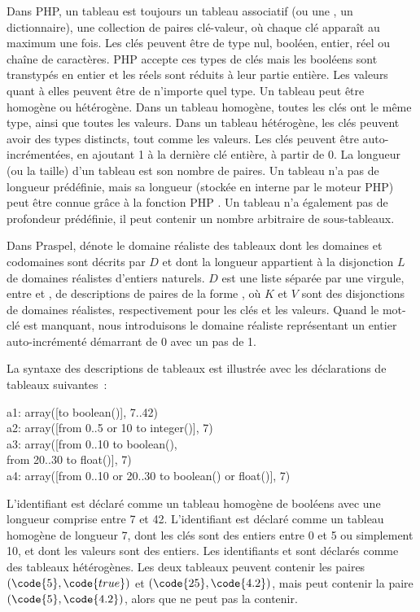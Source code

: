 Dans PHP, un tableau est toujours un {\strong tableau associatif} (ou une
, un {\strong dictionnaire}), \ie une collection de paires
clé-valeur, où chaque clé apparaît au maximum une fois. Les clés peuvent être de
type nul, booléen, entier, réel ou chaîne de caractères. PHP accepte ces types
de clés mais les booléens sont transtypés en entier et les réels sont réduits à
leur partie entière. Les valeurs quant à elles peuvent être de n'importe quel
type. Un tableau peut être {\strong homogène} ou {\strong hétérogène}. Dans un
tableau homogène, toutes les clés ont le même type, ainsi que toutes les
valeurs. Dans un tableau hétérogène, les clés peuvent avoir des types distincts,
tout comme les valeurs.  Les clés peuvent être {\strong auto-incrémentées}, en
ajoutant 1 à la dernière clé entière, à partir de 0. La {\strong longueur} (ou
la {\strong taille}) d'un tableau est son nombre de paires. Un tableau n'a pas
de longueur prédéfinie, mais sa longueur (stockée en interne par le moteur PHP)
peut être connue grâce à la fonction PHP . Un tableau n'a
également pas de profondeur prédéfinie, \ie il peut contenir un nombre
arbitraire de sous-tableaux.

Dans Praspel,  dénote le domaine réaliste des tableaux
dont les domaines et codomaines sont décrits par $D$ et dont la longueur
appartient à la disjonction $L$ de domaines réalistes d'entiers naturels.
$D$ est une liste séparée par une virgule, entre \code{[} et \code{]}, de
{\strong descriptions} de paires de la forme , où $K$ et
$V$ sont des disjonctions de domaines réalistes, respectivement pour les clés et
les valeurs. Quand le mot-clé  est manquant, nous introduisons le
domaine réaliste représentant un entier auto-incrémenté démarrant de 0 avec un
pas de 1.

\begin{example}

La syntaxe des descriptions de tableaux est illustrée avec les déclarations de
tableaux suivantes~:
%
\begin{pre}
a1: array([to boolean()], 7..42) \\
a2: array([from 0..5 or 10 to integer()], 7) \\
a3: array([from 0..10 to boolean(), \\
           from 20..30 to float()], 7) \\
a4: array([from 0..10 or 20..30 to boolean() or float()], 7)
\end{pre}
%
L'identifiant  est déclaré comme un tableau homogène de booléens avec
une longueur comprise entre 7 et 42. L'identifiant  est déclaré comme
un tableau homogène de longueur 7, dont les clés sont des entiers entre 0 et 5
ou simplement 10, et dont les valeurs sont des entiers. Les identifiants
 et  sont déclarés comme des tableaux hétérogènes. Les deux
tableaux peuvent contenir les paires $(\code{5}, \code{true})$ et $(\code{25},
\code{4.2})$, mais  peut contenir la paire $(\code{5}, \code{4.2})$,
alors que  ne peut pas la contenir.

\end{example}

